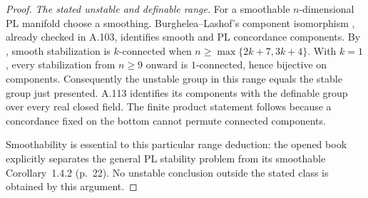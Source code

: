 \begin{proof}
\emph{The stated unstable and definable range.}
For a smoothable $n$-dimensional PL manifold choose a smoothing.
Burghelea--Lashof's component isomorphism
\cite[Theorem~6.1, p.~41; proof pp.~42--43]
{BurgheleaLashof1974II}, already checked in A.103, identifies smooth
and PL concordance components. By
\cite[Theorem~1.4.1, p.~21]{WaldhausenJahrenRognes2013}, smooth
stabilization is $k$-connected when
$n\geq\max\{2k+7,3k+4\}$. With $k=1$, every stabilization from
$n\geq9$ onward is $1$-connected, hence bijective on components.
Consequently the unstable group in this range equals the stable
group just presented. A.113 identifies its components with the
definable group over every real closed field. The finite product
statement follows because a concordance fixed on the bottom cannot
permute connected components.

Smoothability is essential to this particular range deduction:
the opened book explicitly separates the general PL stability
problem from its smoothable Corollary~1.4.2 (p.~22). No unstable
conclusion outside the stated class is obtained by this argument.
\end{proof}
